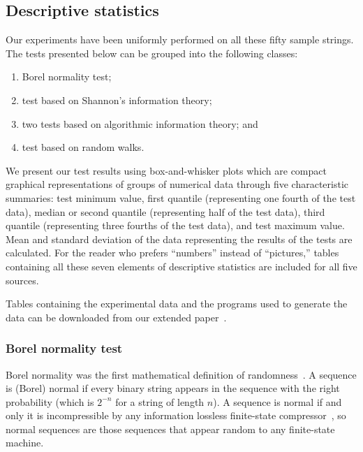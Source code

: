 \documentclass[%
 preprint,
 showpacs,
 showkeys,
 preprintnumbers,
 amsmath,amssymb,
 aps,
 prl,
  longbibliography,
 ]{revtex4-1}
\begin{document}
\subsection{Descriptive statistics}

  Our experiments have been uniformly performed on all these fifty sample strings.
The tests presented below can be grouped into the following classes:
\begin{enumerate}
\item
Borel normality test;
\item
test based on Shannon's information theory;
\item
two tests  based on algorithmic information theory; and
\item
test based on random walks.
\end{enumerate}

We present our test results using
box-and-whisker plots which are compact graphical representations of
groups of numerical data through five characteristic summaries:
 test minimum value, first quantile (representing one fourth of the test data), median or second quantile (representing half of the test data), third quantile (representing three fourths of the test data), and test maximum value.
Mean and standard deviation of the data representing the results of the tests are calculated.
For the reader who prefers ``numbers'' instead of ``pictures,'' tables containing
all these seven elements of descriptive statistics are included for all five sources.

Tables containing the experimental data and the programs used
to generate the data can be downloaded from our extended paper~\cite{CDMTCS372}.

\subsubsection{Borel normality test}

Borel normality was the first mathematical definition of randomness~\cite{borel:09}.
A sequence is (Borel) normal if every  binary string appears in the sequence with the right probability
(which is $2^{-n}$ for a string of length $n$).
A  sequence is normal if and only  it  is incompressible by any information lossless finite-state compressor~\cite{ZL:1978}, so  normal sequences are  those sequences  that appear random to any finite-state machine.
\end{document}
